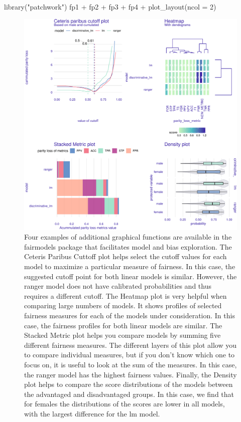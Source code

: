 \begin{Schunk}
\begin{Sinput}
library("patchwork")
fp1 + fp2 + fp3 + fp4 + 
  plot_layout(ncol = 2)
\end{Sinput}
\begin{figure}

{\centering \includegraphics[width=1\linewidth]{RJ-2022-019_files/figure-latex/all-1} 

}

\caption[Four examples of additional graphical functions are available in the fairmodels package that facilitates model and bias exploration]{Four examples of additional graphical functions are available in the fairmodels package that facilitates model and bias exploration. The Ceteris Paribus Cuttoff plot helps select the cutoff values for each model to maximize a particular measure of fairness. In this case, the suggested cutoff point for both linear models is similar. However, the ranger model does not have calibrated probabilities and thus requires a different cutoff. The Heatmap plot is very helpful when comparing large numbers of models. It shows profiles of selected fairness measures for each of the models under consideration. In this case, the fairness profiles for both linear models are similar. The Stacked Metric plot helps you compare models by summing five different fairness measures. The different layers of this plot allow you to compare individual measures, but if you don't know which one to focus on, it is useful to look at the sum of the measures. In this case, the ranger model has the highest fairness values. Finally, the Density plot helps to compare the score distributions of the models between the advantaged and disadvantaged groups. In this case, we find that for females the distributions of the scores are lower in all models, with the largest difference for the lm model. }\label{fig:all}
\end{figure}
\end{Schunk}

